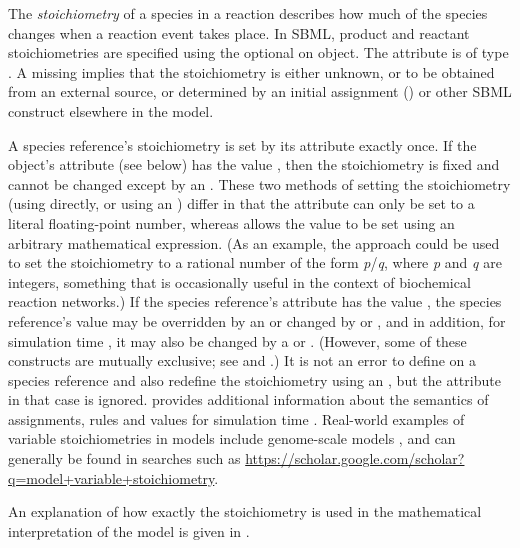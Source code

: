 The {\em stoichiometry} of a species in a reaction describes how
much of the species changes when a reaction event takes place.  In
SBML, product and reactant stoichiometries are specified using the
optional  on \SpeciesReference object.  The
 attribute is of type .  A missing
 implies that the stoichiometry is either
unknown, or to be obtained from an external source, or determined
by an initial assignment () or
other SBML construct elsewhere in the model.

A species reference's stoichiometry is set by its
 attribute exactly once.  If the
\SpeciesReference object's  attribute (see below)
has the value , then the stoichiometry is fixed and
cannot be changed except by an \InitialAssignment.  These two
methods of setting the stoichiometry (\ie using
 directly, or using an \InitialAssignment)
differ in that the  attribute can only be set
to a literal floating-point number, whereas \InitialAssignment
allows the value to be set using an arbitrary mathematical
expression.  (As an example, the approach could be used to set the
stoichiometry to a rational number of the form \emph{p}/\emph{q},
where \emph{p} and \emph{q} are integers, something that is
occasionally useful in the context of biochemical reaction
networks.)  If the species reference's  attribute
has the value , the species reference's value may be
overridden by an \InitialAssignment or changed by \AssignmentRule
or \AlgebraicRule, and in addition, for simulation time ,
it may also be changed by a \RateRule or \Event.  (However,
some of these constructs are mutually exclusive; see
 and .)  It is not an
error to define  on a species reference and
also redefine the stoichiometry using an \InitialAssignment, but
the  attribute in that case is ignored.
 provides additional information about
the semantics of assignments, rules and values for simulation time
.  Real-world examples of variable stoichiometries in models include genome-scale models \citep{obrien:2013}, and can generally be found in searches such as \url{https://scholar.google.com/scholar?q=model+variable+stoichiometry}.

An explanation of how exactly the stoichiometry is used in the
mathematical interpretation of the model is given in
.


